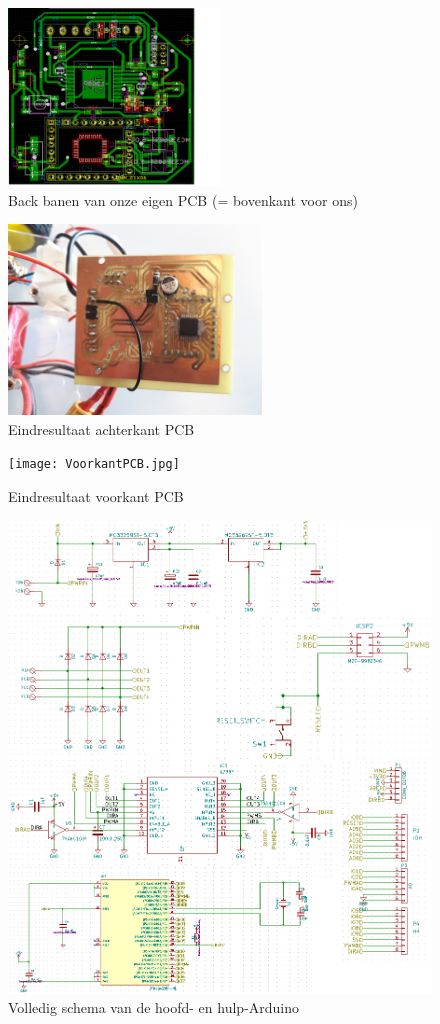 \begin{figure}[h]
\centering
\includegraphics[width=0.5\textwidth]{Back.png}
\caption{Back banen van onze eigen PCB (= bovenkant voor ons)}
\label{fig:back}
\end{figure}

\begin{figure}[h]
\centering
\includegraphics[width=0.6\textwidth]{AchterkantPCB.jpg}
\caption{Eindresultaat achterkant PCB}
\label{fig:achterkantPCB}
\end{figure}

\begin{figure}[h]
\centering
\texttt{[image: VoorkantPCB.jpg]}
\caption{Eindresultaat voorkant PCB}
\label{fig:voorkantPCB}
\end{figure}

\begin{figure}[h]
\centering
\includegraphics[width=1\textwidth]{volledigschema}
\caption{Volledig schema van de hoofd- en hulp-Arduino}
\label{schema}
\end{figure}
